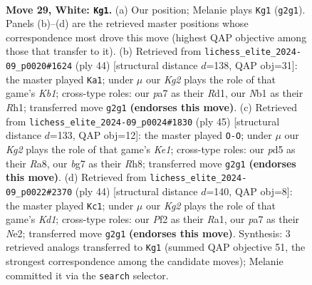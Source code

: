 \documentclass[11pt]{article}
\begin{document}
\clearpage

\begin{figure}[p]\centering
\begin{subfigure}{0.46\textwidth}\centering
\resizebox{\linewidth}{!}{%
\newchessgame
\chessboard[
  setfen={r1br4/pp3pbk/n2qpnp1/P2p2Bp/B2P3P/6P1/RPPNQPK1/1N2R3 w - - 11 29},
  showmover=false,
  pgfstyle=straightmove, color=movearrow, markmove={g2-g1}
]}
\caption{}
\end{subfigure}\hfill
\begin{subfigure}{0.46\textwidth}\centering
\resizebox{\linewidth}{!}{%
\newchessgame
\chessboard[
  setfen={1knr4/1pprb2b/p1n4q/3P2p1/N1P2p1p/1P1N1P2/PB2BQ1P/1K1R3R w - - 1 23},
  showmover=false,
  pgfstyle=straightmove, color=movearrow, markmove={b1-a1}
]}
\caption{}
\end{subfigure}
\\[4pt]
\begin{subfigure}{0.46\textwidth}\centering
\resizebox{\linewidth}{!}{%
\newchessgame
\chessboard[
  setfen={r3k2r/5ppp/1qn1p1b1/np1pP3/p2P3Q/P4N1P/1P1B1PP1/R2B1RK1 b kq - 4 23},
  showmover=false,
  pgfstyle=straightmove, color=movearrow, markmove={e8-g8}
]}
\caption{}
\end{subfigure}\hfill
\begin{subfigure}{0.46\textwidth}\centering
\resizebox{\linewidth}{!}{%
\newchessgame
\chessboard[
  setfen={3r1k1r/bp3pp1/p1b1p2p/q2nP2P/3p1PP1/P2B3Q/1PP1NB2/R2K1R2 w - - 2 23},
  showmover=false,
  pgfstyle=straightmove, color=movearrow, markmove={d1-c1}
]}
\caption{}
\end{subfigure}
\caption{\textbf{Move 29, White: \texttt{Kg1}.} (a) Our position; Melanie plays \texttt{Kg1} (\texttt{g2g1}). Panels (b)--(d) are the retrieved master positions whose correspondence most drove this move (highest QAP objective among those that transfer to it). (b) Retrieved from \texttt{lichess\_elite\_2024-09\_p0020\#1624} (ply 44) [structural distance $d$=138, QAP obj=31]: the master played \texttt{Ka1}; under $\mu$ our \emph{Kg2} plays the role of that game's \emph{Kb1}; cross-type roles: our \emph{p}a7 as their \emph{R}d1, our \emph{N}b1 as their \emph{R}h1; transferred move \texttt{g2g1} \textbf{(endorses this move)}. (c) Retrieved from \texttt{lichess\_elite\_2024-09\_p0024\#1830} (ply 45) [structural distance $d$=133, QAP obj=12]: the master played \texttt{O-O}; under $\mu$ our \emph{Kg2} plays the role of that game's \emph{Ke1}; cross-type roles: our \emph{p}d5 as their \emph{R}a8, our \emph{b}g7 as their \emph{R}h8; transferred move \texttt{g2g1} \textbf{(endorses this move)}. (d) Retrieved from \texttt{lichess\_elite\_2024-09\_p0022\#2370} (ply 44) [structural distance $d$=140, QAP obj=8]: the master played \texttt{Kc1}; under $\mu$ our \emph{Kg2} plays the role of that game's \emph{Kd1}; cross-type roles: our \emph{P}f2 as their \emph{R}a1, our \emph{p}a7 as their \emph{N}e2; transferred move \texttt{g2g1} \textbf{(endorses this move)}. Synthesis: 3 retrieved analogs transferred to \texttt{Kg1} (summed QAP objective 51, the strongest correspondence among the candidate moves); Melanie committed it via the \texttt{search} selector.}
\label{fig:thought-m56}
\end{figure}
\end{document}
